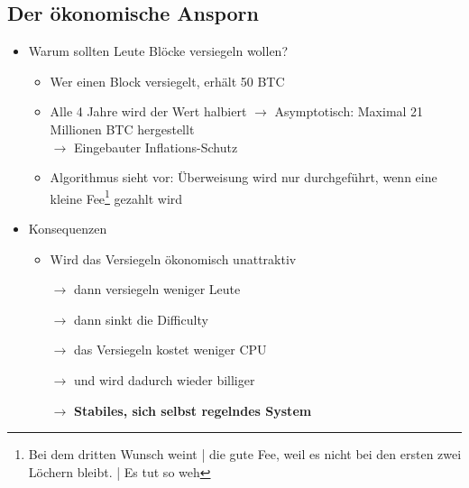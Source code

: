 \documentclass{article} %
\begin{document}
	\subsection{Der ökonomische Ansporn}
		\begin{itemize}
			\item Warum sollten Leute Blöcke versiegeln wollen?
			\begin{itemize}
				\item Wer einen Block versiegelt, erhält 50 BTC
				\item Alle 4 Jahre wird der Wert halbiert $\rightarrow$ Asymptotisch: Maximal 21 Millionen BTC hergestellt\\				
				$\rightarrow$ Eingebauter Inflations-Schutz
				\item Algorithmus sieht vor: Überweisung wird nur durchgeführt, wenn eine kleine Fee\footnote{Bei dem dritten Wunsch weint | die gute Fee, weil es nicht bei den ersten zwei Löchern bleibt. | \glqq Es tut so weh\grqq} gezahlt wird
			\end{itemize}
			\item Konsequenzen
			\begin{itemize}
				\item Wird das Versiegeln ökonomisch unattraktiv
				\item[$\rightarrow$] dann versiegeln weniger Leute
				\item[$\rightarrow$] dann sinkt die Difficulty
				\item[$\rightarrow$] das Versiegeln kostet weniger CPU
				\item[$\rightarrow$] und wird dadurch wieder billiger
				\item[$\rightarrow$]\textbf{Stabiles, sich selbst regelndes System}
			\end{itemize}
			\end{itemize}
			
\end{document}
